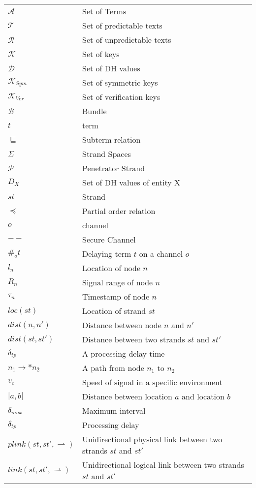  \begin{longtable}[l]{p{100pt} p{250pt}} 
$\mathcal{A}$ & Set of Terms \\
$\mathcal{T}$ & Set of predictable texts \\
$\mathcal{R}$ & Set of unpredictable texts \\
$\mathcal{K}$ & Set of keys \\
$\mathcal{D}$ & Set of DH values \\
$\mathcal{K}_{Sym}$ & Set of symmetric keys \\
$\mathcal{K}_{Ver}$ & Set of verification keys \\
$\mathcal{B}$ & Bundle \\
$t$ & term \\
$\sqsubseteq$ & Subterm relation \\
$\Sigma$ & Strand Spaces \\
$\mathcal{P}$ & Penetrator Strand \\
$D_X$ & Set of DH values of entity X \\ 
$st$ & Strand \\
$\preceq$ & Partial order relation\\ 
$o$ & channel \\
$--$ & Secure Channel \\
$\#_ot$ & Delaying term $t$ on a channel $o$ \\
$l_n$ & Location of node $n$ \\
$R_n$ & Signal range of node $n$ \\
$\tau_{n}$ & Timestamp of node $n$ \\
$loc(st)$ & Location of strand $st$ \\
$dist(n,n')$ & Distance between node $n$ and $n'$ \\
$dist(st,st')$ & Distance between two strands $st$ and $st'$ \\
$\delta_{tp}$ & A processing delay time\\
$n_1 \rightarrow * n_2$ & A path from node $n_1$ to $n_2$ \\
$v_c$ & Speed of signal in a specific environment \\
$| a, b |$ & Distance between location $a$ and location $b$ \\
$\delta_{max}$ & Maximum interval \\
$\delta_{tp}$ & Processing delay \\ 
$plink(st,st', \rightharpoonup)$ & Unidirectional physical link between two strands $st$ and $st'$ \\
$link(st,st', \rightharpoonup)$ & Unidirectional logical link between two strands $st$ and $st'$ \\

\end{longtable}
